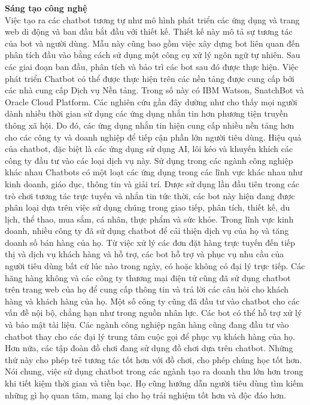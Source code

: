 \textbf{Sáng tạo công nghệ} \\[0.2em]
Việc tạo ra các chatbot tương tự như mô hình phát triển các ứng dụng và trang web di động và ban đầu bắt đầu với thiết kế. Thiết kế này mô tả sự tương tác của bot và người dùng. Mẫu này cũng bao gồm việc xây dựng bot liên quan đến phân tích đầu vào bằng cách sử dụng một công cụ xử lý ngôn ngữ tự nhiên. Sau các giai đoạn ban đầu, phân tích và bảo trì các bot sau đó được thực hiện.
Việc phát triển Chatbot có thể được thực hiện trên các nền tảng được cung cấp bởi các nhà cung cấp Dịch vụ Nền tảng. Trong số này có IBM Watson, SnatchBot và Oracle Cloud Platform.
Các nghiên cứu gần đây dường như cho thấy mọi người dành nhiều thời gian sử dụng các ứng dụng nhắn tin hơn phương tiện truyền thông xã hội. Do đó, các ứng dụng nhắn tin hiện cung cấp nhiều nền tảng hơn cho các công ty và doanh nghiệp để tiếp cận phần lớn người tiêu dùng. Hiệu quả của chatbot, đặc biệt là các ứng dụng sử dụng AI, lôi kéo và khuyến khích các công ty đầu tư vào các loại dịch vụ này.
Sử dụng trong các ngành công nghiệp khác nhau
Chatbots có một loạt các ứng dụng trong các lĩnh vực khác nhau như kinh doanh, giáo dục, thông tin và giải trí. Được sử dụng lần đầu tiên trong các trò chơi tương tác trực tuyến và nhắn tin tức thời, các bot này hiện đang được phân loại dựa trên việc sử dụng chúng trong giao tiếp, phân tích, thiết kế, du lịch, thể thao, mua sắm, cá nhân, thực phẩm và sức khỏe.
Trong lĩnh vực kinh doanh, nhiều công ty đã sử dụng chatbot để cải thiện dịch vụ của họ và tăng doanh số bán hàng của họ. Từ việc xử lý các đơn đặt hàng trực tuyến đến tiếp thị và dịch vụ khách hàng và hỗ trợ, các bot hỗ trợ và phục vụ nhu cầu của người tiêu dùng bất cứ lúc nào trong ngày, có hoặc không có đại lý trực tiếp. Các hãng hàng không và các công ty thương mại điện tử cũng đã sử dụng chatbot trên trang web của họ để cung cấp thông tin và trả lời các câu hỏi cho khách hàng và khách hàng của họ.
Một số công ty cũng đã đầu tư vào chatbot cho các vấn đề nội bộ, chẳng hạn như trong nguồn nhân lực. Các bot có thể hỗ trợ xử lý và bảo mật tài liệu. Các ngành công nghiệp ngân hàng cũng đang đầu tư vào chatbot thay cho các đại lý trung tâm cuộc gọi để phục vụ khách hàng của họ. Hơn nữa, các tập đoàn đồ chơi đang sử dụng đồ chơi dựa trên chatbot. Những thứ này cho phép trẻ tương tác tốt hơn với đồ chơi, cho phép chúng học tốt hơn.
Nói chung, việc sử dụng chatbot trong các ngành tạo ra doanh thu lớn hơn trong khi tiết kiệm thời gian và tiền bạc. Họ cũng hướng dẫn người tiêu dùng tìm kiếm những gì họ quan tâm, mang lại cho họ trải nghiệm tốt hơn và độc đáo hơn.

